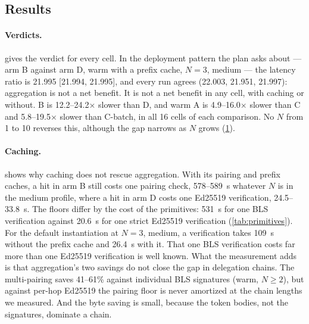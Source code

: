 \documentclass[11pt,a4paper]{article}
\begin{document}
\subsection{Results}
\label{sec:eval-results}

\paragraph{Verdicts.}
 gives the verdict for every cell. In the deployment
pattern the plan asks about --- arm B against arm D, warm with a prefix
cache, $N = 3$, medium --- the latency ratio is 21.995 [21.994, 21.995],
and every run agrees (22.003, 21.951, 21.997): aggregation is not a net
benefit. It is not a net benefit in any cell, with caching or without.
B is 12.2--24.2$\times$ slower than D, and warm A is 4.9--16.0$\times$
slower than C and 5.8--19.5$\times$ slower than C-batch, in all 16 cells
of each comparison. No $N$ from 1 to 10 reverses this, although the gap
narrows as $N$ grows (\cref{fig:ratios}).

\begin{figure}[t]
\centering
{}
\caption{\figcapRatios}
\label{fig:ratios}
\end{figure}

\begin{table}[t]
\centering
\small
\caption{Verdicts of the frozen plan: median latency ratio of the
aggregating arm over the non-aggregating one, with its pooled bootstrap
95\% confidence interval, and the verdict ($-$: not a net benefit). The
same verdict holds for B/D in the prefix-miss state.}
\label{tab:verdicts}
\end{table}

\begin{figure}[t]
\centering
{}
\caption{\figcapLatencyWarm}
\label{fig:latency-warm}
\end{figure}

\paragraph{Caching.}
 shows why caching does not rescue aggregation.
With its pairing and prefix caches, a hit in arm B still costs one
pairing check, 578--589~\textmu{}s whatever $N$ is in the medium
profile, where a hit in arm D costs one Ed25519 verification,
24.5--33.8~\textmu{}s. The floors differ by the cost of the primitives:
531~\textmu{}s for one BLS verification against 20.6~\textmu{}s for one
strict Ed25519 verification (\cref{tab:primitives}). For the default
instantiation at $N = 3$, medium, a verification takes 109~\textmu{}s
without the prefix cache and 26.4~\textmu{}s with it. That one BLS
verification costs far more than one Ed25519 verification is well known.
What the measurement adds is that aggregation's two savings do not close
the gap in delegation chains. The multi-pairing saves 41--61\% against
individual BLS signatures (warm, $N \geq 2$), but against per-hop
Ed25519 the pairing floor is never amortized at the chain lengths we
measured. And the byte saving is small, because the token bodies, not
the signatures, dominate a chain.
\end{document}
